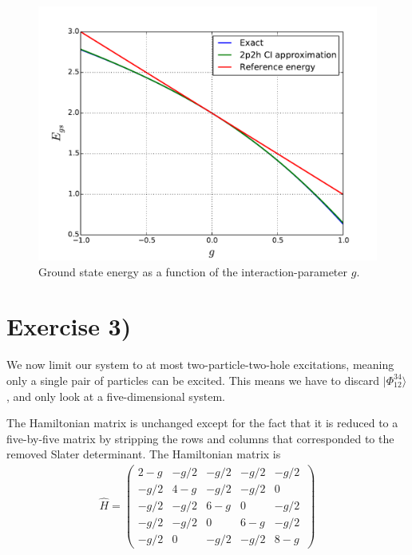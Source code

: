 \documentclass[a4paper, 11pt, notitlepage, english]{article}
\newcommand{\ket}[1]{|#1 \rangle}
\newcommand{\op}[1]{\hat{#1}}
\begin{document}
\begin{figure}[htpb]
	\includegraphics[width=\textwidth]{proj2_2.pdf}
	\caption{Ground state energy as a function of the interaction-parameter $g$. \label{fig:plot1}}
\end{figure}

\clearpage

\section*{Exercise 3)}

We now limit our system to at most two-particle-two-hole excitations, meaning only a single pair of particles can be excited. This means we have to discard $\ket{\Phi_{12}^{34}}$, and only look at a five-dimensional system.

The Hamiltonian matrix is unchanged except for the fact that it is reduced to a five-by-five matrix by stripping the rows and columns that corresponded to the removed Slater determinant. The Hamiltonian matrix is
\begin{align*}
\op{H} = \begin{pmatrix}
2 - g &  -g/2 & -g/2  & -g/2  & -g/2  \\
-g/2  & 4 - g & -g/2  & -g/2  & 0     \\
-g/2  & -g/2  & 6 - g &	0     & -g/2  \\              
-g/2  & -g/2  & 0     & 6 - g &	-g/2  \\                         
-g/2  &	0	  & -g/2  & -g/2  & 8 - g \
\end{pmatrix}
\end{align*}
\end{document}

